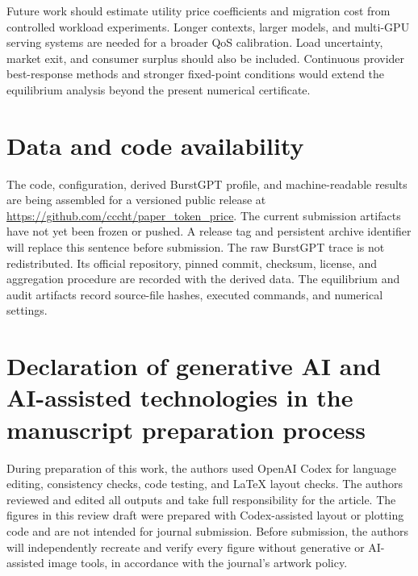 \documentclass[11pt,a4paper]{article}
\begin{document}
Future work should estimate utility price coefficients and migration cost from controlled workload experiments. Longer contexts, larger models, and multi-GPU serving systems are needed for a broader QoS calibration. Load uncertainty, market exit, and consumer surplus should also be included. Continuous provider best-response methods and stronger fixed-point conditions would extend the equilibrium analysis beyond the present numerical certificate.

\section*{Data and code availability}

The code, configuration, derived BurstGPT profile, and machine-readable results are being assembled for a versioned public release at \url{https://github.com/cccht/paper_token_price}. The current submission artifacts have not yet been frozen or pushed. A release tag and persistent archive identifier will replace this sentence before submission. The raw BurstGPT trace is not redistributed. Its official repository, pinned commit, checksum, license, and aggregation procedure are recorded with the derived data. The equilibrium and audit artifacts record source-file hashes, executed commands, and numerical settings.

\section*{Declaration of generative AI and AI-assisted technologies in the manuscript preparation process}

During preparation of this work, the authors used OpenAI Codex for language editing, consistency checks, code testing, and LaTeX layout checks. The authors reviewed and edited all outputs and take full responsibility for the article. The figures in this review draft were prepared with Codex-assisted layout or plotting code and are not intended for journal submission. Before submission, the authors will independently recreate and verify every figure without generative or AI-assisted image tools, in accordance with the journal's artwork policy.



\end{document}
